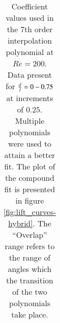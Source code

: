 \begin{table}[!h]
\begin{center}
\begin{tabular}{c c c c c c}
          
  
  
\hline %


\end{tabular}

\caption{Coefficient values used in the 7th order interpolation polynomial at $Re=200$. Data present for $\frac{d}{l}=0-0.75$ at increments of $0.25$. Multiple polynomials were used to attain a better fit. The plot of the compound fit is presented in figure \ref{fig:lift_curves-hybrid}. The ``Overlap'' range refers to the range of angles which the transition of the two polynomials take place.} 
 
\label{table:cy-coefficients-hybrid} %
\end{center}
\end{table}

